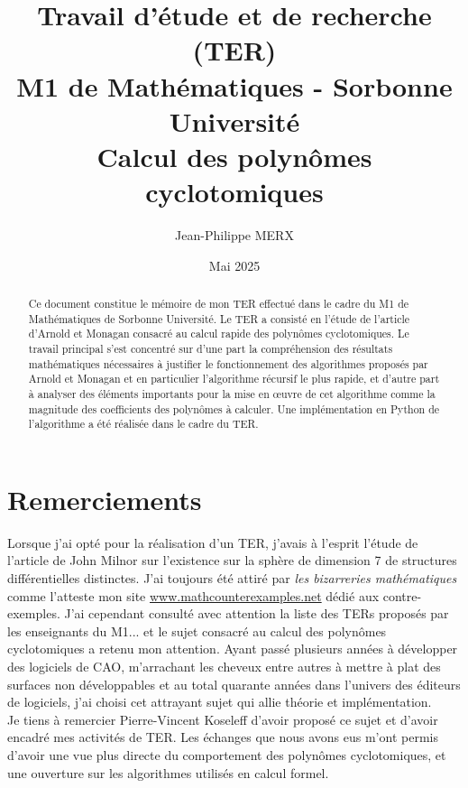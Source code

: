\documentclass{article}
\theoremstyle{break}                  %
\begin{document}
\lstset{language=python}

\title{Travail d'étude et de recherche (TER)\\
M1 de Mathématiques - Sorbonne Université\\
Calcul des polynômes cyclotomiques}
\author{Jean-Philippe MERX}
\date{Mai 2025}

\maketitle

\begin{abstract}
	Ce document constitue le mémoire de mon TER effectué dans le cadre du M1 de Mathématiques de Sorbonne Université. Le TER a consisté en l'étude de l'article \cite{monagan} d'Arnold et Monagan consacré au calcul rapide des polynômes cyclotomiques. Le travail principal s'est concentré sur d'une part la compréhension des résultats mathématiques nécessaires à justifier le fonctionnement des algorithmes proposés par Arnold et Monagan et en particulier l'algorithme récursif le plus rapide, et d'autre part à analyser des éléments importants pour la mise en œuvre de cet algorithme comme la magnitude des coefficients des polynômes à calculer. Une implémentation en Python de l'algorithme a été réalisée dans le cadre du TER.
\end{abstract}

\section*{Remerciements}
Lorsque j'ai opté pour la réalisation d'un TER, j'avais à l'esprit l'étude de l'article de John Milnor sur l'existence sur la sphère de dimension 7 de structures différentielles distinctes. J'ai toujours été attiré par \emph{les bizarreries mathématiques} comme l'atteste mon site \href{https://www.mathcounterexamples.net/}{www.mathcounterexamples.net} dédié aux contre-exemples. J'ai cependant consulté avec attention la liste des TERs proposés par les enseignants du M1... et le sujet consacré au calcul des polynômes cyclotomiques a retenu mon attention. Ayant passé plusieurs années à développer des logiciels de CAO, m'arrachant les cheveux entre autres à mettre à plat des surfaces non développables et au total quarante années dans l'univers des éditeurs de logiciels, j'ai choisi cet attrayant sujet qui allie théorie et implémentation.\\

Je tiens à remercier Pierre-Vincent Koseleff d'avoir proposé ce sujet et d'avoir encadré mes activités de TER. Les échanges que nous avons eus m'ont permis d'avoir une vue plus directe du comportement des polynômes cyclotomiques, et une ouverture sur les algorithmes utilisés en calcul formel.
\end{document}

